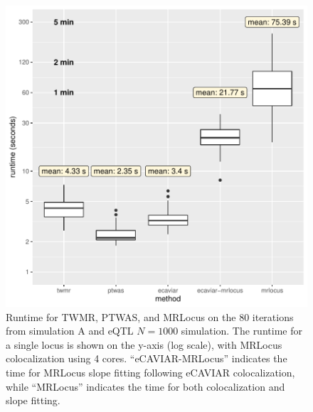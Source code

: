 \documentclass[11pt]{article}
\begin{document}
\begin{figure}[!ht]
  \centering
  \includegraphics[width=.7\textwidth]{figs/runtime}
  \caption{Runtime for TWMR, PTWAS, and MRLocus on the 80 iterations
    from simulation A and eQTL $N=1000$ simulation.
    The runtime for a single locus is shown on the y-axis (log
    scale), with MRLocus colocalization using 4
    cores. ``eCAVIAR-MRLocus'' indicates the time for MRLocus slope
    fitting following eCAVIAR colocalization, while ``MRLocus''
    indicates the time for both colocalization and slope fitting.}
\end{figure}
\end{document}
